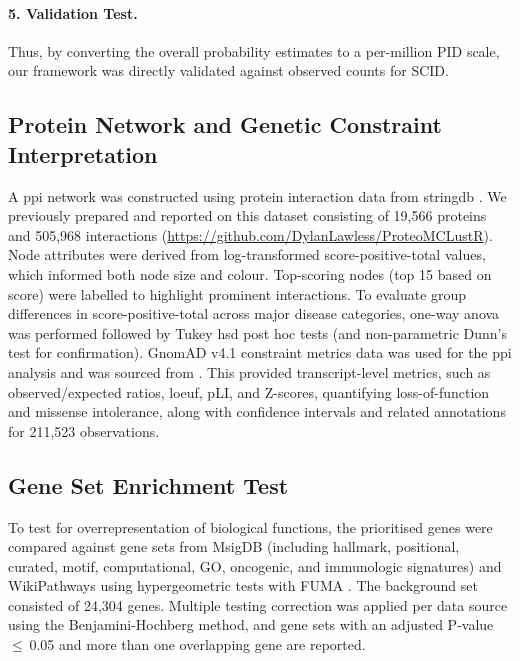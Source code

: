 \paragraph{5. Validation Test.}
Thus, by converting the overall probability estimates to a per-million PID scale, our framework was directly validated against observed counts for SCID. %


\subsection{Protein Network and Genetic Constraint Interpretation}
A \ac{ppi} network was constructed using protein interaction data from \ac{stringdb} \cite{szklarczyk2025string}. We previously prepared and reported 
on this dataset consisting of 19,566 proteins and 505,968 interactions 
(\url{https://github.com/DylanLawless/ProteoMCLustR}).
Node attributes were derived from log-transformed score-positive-total values, which informed both node size and colour. Top-scoring nodes (top 15 based on score) were labelled to highlight prominent interactions. To evaluate group differences in score-positive-total across major disease categories, one-way \ac{anova} was performed followed by Tukey \ac{hsd} post hoc tests (and non-parametric Dunn’s test for confirmation). 
GnomAD v4.1 constraint metrics data was used for the \ac{ppi} analysis and was sourced from \citet{karczewski2020mutational}.
This provided transcript-level metrics, such as observed/expected ratios, \ac{loeuf}, pLI, and Z-scores, quantifying loss-of-function and missense intolerance, along with confidence intervals and related annotations for 211,523 observations.

\subsection{Gene Set Enrichment Test}

To test for overrepresentation of biological functions, the prioritised genes were compared against gene sets from MsigDB (including hallmark, positional, curated, motif, computational, GO, oncogenic, and immunologic signatures) and WikiPathways using hypergeometric tests with FUMA \cite{watanabe_functional_2017, liberzon_molecular_2011}. The background set consisted of 24,304 genes. Multiple testing correction was applied per data source using the Benjamini-Hochberg method, and gene sets with an adjusted P-value $\le$ 0.05 and more than one overlapping gene are reported.


